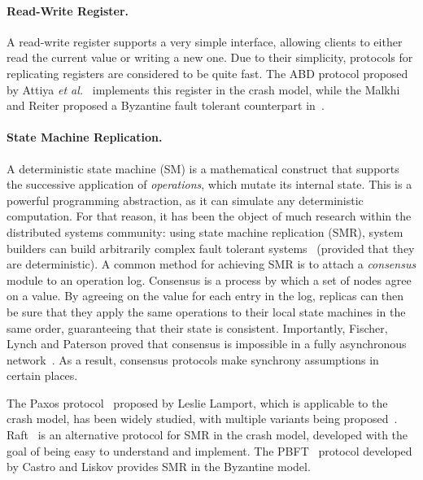 \paragraph{Read-Write Register.} A read-write register supports a
very simple interface, allowing clients to either read the
current value or writing a new one. Due to their simplicity,
protocols for replicating registers are considered to be quite
fast. The ABD protocol proposed by Attiya
\emph{et al.}~\cite{abd} implements this register in the crash
model, while the Malkhi and Reiter proposed a Byzantine fault tolerant
counterpart in~\cite{bqs}.

\paragraph{State Machine Replication.} A deterministic state machine (SM) is a
mathematical construct that supports the successive application of
\emph{operations}, which mutate its internal state. This is a
powerful programming abstraction, as it can simulate any
deterministic computation. For that reason, it has been the
object of much research within the distributed systems community:
using state machine replication (SMR), system builders can build
arbitrarily complex fault tolerant systems~\cite{schneider-smr} (provided that they
are deterministic). A common method for achieving SMR is to
attach a \emph{consensus} module to an operation log. Consensus
is a process by which a set of nodes agree on a value. By agreeing
on the value for each entry in the log, replicas can then be sure
that they apply the same operations to their local state machines in the same order,
guaranteeing that their state is consistent. Importantly,
Fischer, Lynch and Paterson proved that consensus is impossible
in a fully asynchronous network~\cite{flp}. As a result,
consensus protocols make synchrony assumptions in certain places.

The Paxos protocol~\cite{paxos} proposed by Leslie Lamport, which
is applicable to the crash model, has been widely studied, with
multiple variants being
proposed~\cite{fp,fast-paxos,egalitarian-paxos,disk-paxos,paxos_builders}.
Raft~\cite{raft} is an alternative protocol for SMR in the crash
model, developed with the goal of being easy to understand and
implement. The PBFT~\cite{pbft} protocol developed by Castro and
Liskov provides SMR in the Byzantine model.

